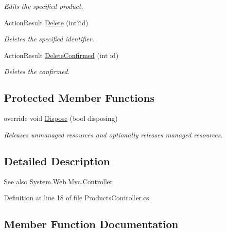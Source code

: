 \begin{DoxyCompactItemize}
\begin{DoxyCompactList}\small\item\em Edits the specified product. \end{DoxyCompactList}\item 
Action\+Result \hyperlink{class_open_1_1_g_i_1_1hypermart_1_1_controllers_1_1_products_controller_ae0da78ed558e1b19fa9575223f39738a}{Delete} (int?id)
\begin{DoxyCompactList}\small\item\em Deletes the specified identifier. \end{DoxyCompactList}\item 
Action\+Result \hyperlink{class_open_1_1_g_i_1_1hypermart_1_1_controllers_1_1_products_controller_a043d74a7640e6cd249143de4c9641404}{Delete\+Confirmed} (int id)
\begin{DoxyCompactList}\small\item\em Deletes the confirmed. \end{DoxyCompactList}\end{DoxyCompactItemize}
\subsection*{Protected Member Functions}
\begin{DoxyCompactItemize}
\item 
override void \hyperlink{class_open_1_1_g_i_1_1hypermart_1_1_controllers_1_1_products_controller_a242db0a0ce58c01d24fc41273dcc393f}{Dispose} (bool disposing)
\begin{DoxyCompactList}\small\item\em Releases unmanaged resources and optionally releases managed resources. \end{DoxyCompactList}\end{DoxyCompactItemize}


\subsection{Detailed Description}


\begin{DoxySeeAlso}{See also}
System.\+Web.\+Mvc.\+Controller


\end{DoxySeeAlso}


Definition at line 18 of file Products\+Controller.\+cs.



\subsection{Member Function Documentation}
\hypertarget{class_open_1_1_g_i_1_1hypermart_1_1_controllers_1_1_products_controller_a1ead91e895aa356b20ba2840eafe0a99}{}
